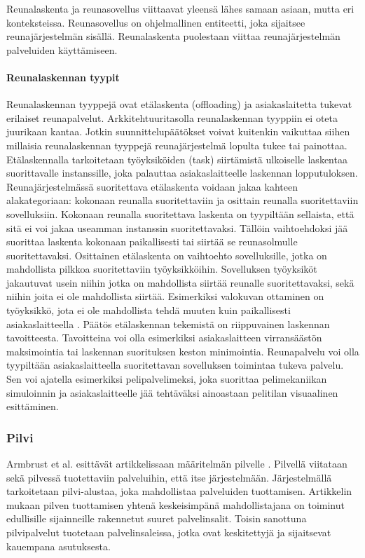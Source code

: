 Reunalaskenta ja reunasovellus viittaavat yleensä lähes samaan asiaan, mutta eri konteksteissa. 
Reunasovellus on ohjelmallinen entiteetti, joka sijaitsee reunajärjestelmän sisällä.
Reunalaskenta puolestaan viittaa reunajärjestelmän palveluiden käyttämiseen.

\paragraph{Reunalaskennan tyypit}

Reunalaskennan tyyppejä ovat etälaskenta (offloading) ja asiakaslaitetta tukevat erilaiset reunapalvelut.
Arkkitehtuuritasolla reunalaskennan tyyppiin ei oteta juurikaan kantaa. 
Jotkin suunnittelupäätökset voivat kuitenkin vaikuttaa siihen millaisia reunalaskennan tyyppejä reunajärjestelmä lopulta tukee tai painottaa.
Etälaskennalla tarkoitetaan työyksiköiden (task) siirtämistä ulkoiselle laskentaa suorittavalle instanssille, joka palauttaa asiakaslaitteelle laskennan lopputuloksen. 
Reunajärjestelmässä suoritettava etälaskenta voidaan jakaa kahteen alakategoriaan: kokonaan reunalla suoritettaviin ja osittain reunalla suoritettaviin sovelluksiin\cite{mach17mobile}.
Kokonaan reunalla suoritettava laskenta on tyypiltään sellaista, että sitä ei voi jakaa useamman instanssin suoritettavaksi.
Tällöin vaihtoehdoksi jää suorittaa laskenta kokonaan paikallisesti tai siirtää se reunasolmulle suoritettavaksi.
Osittainen etälaskenta on vaihtoehto sovelluksille, jotka on mahdollista pilkkoa suoritettaviin työyksikköihin. 
Sovelluksen työyksiköt jakautuvat usein niihin jotka on mahdollista siirtää reunalle suoritettavaksi, sekä niihin joita ei ole mahdollista siirtää. 
Esimerkiksi valokuvan ottaminen on työyksikkö, jota ei ole mahdollista tehdä muuten kuin paikallisesti asiakaslaitteella \cite{mach17mobile}.
Päätös etälaskennan tekemistä on riippuvainen laskennan tavoitteesta. 
Tavoitteina voi olla esimerkiksi asiakaslaitteen virransäästön maksimointia tai laskennan suorituksen keston minimointia.
Reunapalvelu voi olla tyypiltään asiakaslaitteella suoritettavan sovelluksen toimintaa tukeva palvelu. Sen voi ajatella esimerkiksi pelipalvelimeksi, joka suorittaa pelimekaniikan simuloinnin ja asiakaslaitteelle jää tehtäväksi ainoastaan pelitilan visuaalinen esittäminen.  



\subsubsection{Pilvi}
Armbrust et al. esittävät artikkelissaan määritelmän pilvelle \cite{armbrust2010view}. 
Pilvellä viitataan sekä pilvessä tuotettaviin palveluihin, että itse järjestelmään.
Järjestelmällä tarkoitetaan pilvi-alustaa, joka mahdollistaa palveluiden tuottamisen.
Artikkelin mukaan pilven tuottamisen yhtenä keskeisimpänä mahdollistajana on toiminut edullisille sijainneille rakennetut suuret palvelinsalit.
Toisin sanottuna pilvipalvelut tuotetaan palvelinsaleissa, jotka ovat keskitettyjä ja sijaitsevat kauempana asutuksesta. 

